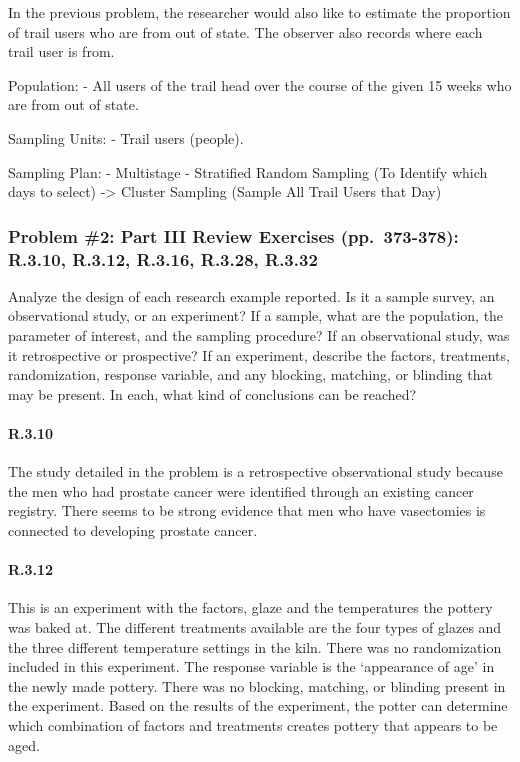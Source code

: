 \documentclass[]{article}
\let\oldparagraph\paragraph
\renewcommand{\paragraph}[1]{\oldparagraph{#1}\mbox{}}
\begin{document}
In the previous problem, the researcher would also like to estimate the
proportion of trail users who are from out of state. The observer also
records where each trail user is from.

Population: - All users of the trail head over the course of the given
15 weeks who are from out of state.

Sampling Units: - Trail users (people).

Sampling Plan: - Multistage - Stratified Random Sampling (To Identify
which days to select) -\textgreater{} Cluster Sampling (Sample All Trail
Users that Day)

\hypertarget{problem-2-part-iii-review-exercises-pp.-373-378-r.3.10-r.3.12-r.3.16-r.3.28-r.3.32}{%
\subsubsection{Problem \#2: Part III Review Exercises (pp.~373-378):
R.3.10, R.3.12, R.3.16, R.3.28,
R.3.32}\label{problem-2-part-iii-review-exercises-pp.-373-378-r.3.10-r.3.12-r.3.16-r.3.28-r.3.32}}

Analyze the design of each research example reported. Is it a sample
survey, an observational study, or an experiment? If a sample, what are
the population, the parameter of interest, and the sampling procedure?
If an observational study, was it retrospective or prospective? If an
experiment, describe the factors, treatments, randomization, response
variable, and any blocking, matching, or blinding that may be present.
In each, what kind of conclusions can be reached?

\hypertarget{r.3.10}{%
\paragraph{R.3.10}\label{r.3.10}}

The study detailed in the problem is a retrospective observational study
because the men who had prostate cancer were identified through an
existing cancer registry. There seems to be strong evidence that men who
have vasectomies is connected to developing prostate cancer.

\hypertarget{r.3.12}{%
\paragraph{R.3.12}\label{r.3.12}}

This is an experiment with the factors, glaze and the temperatures the
pottery was baked at. The different treatments available are the four
types of glazes and the three different temperature settings in the
kiln. There was no randomization included in this experiment. The
response variable is the `appearance of age' in the newly made pottery.
There was no blocking, matching, or blinding present in the experiment.
Based on the results of the experiment, the potter can determine which
combination of factors and treatments creates pottery that appears to be
aged.
\end{document}
